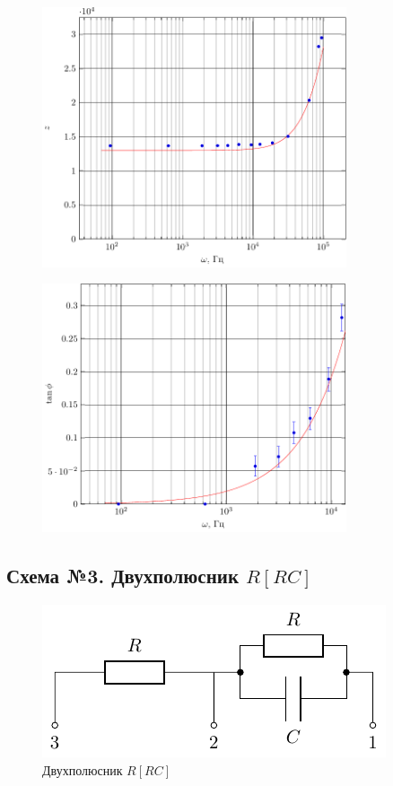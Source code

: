 
\begin{figure}[H]
	\centering
	\includegraphics[width=0.8\textwidth]{img/chem2_z}
	\label{fig:LC_z}
\end{figure}
\begin{figure}[H]
	\centering
	\includegraphics[width=0.8\textwidth]{img/chem2_phi}
	\label{fig:LC_tanphi}
\end{figure}

\subsection{Схема №3. Двухполюсник $R[RC]$}
\begin{figure}[H]
	\centering
	\includegraphics[]{chems/chem3}
	\caption{Двухполюсник $R[RC]$}
	\label{fig:RRC}
\end{figure}

